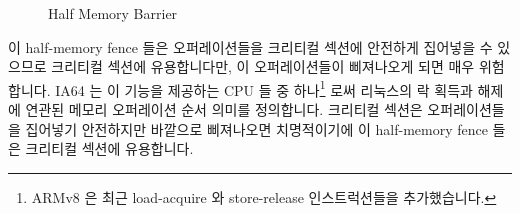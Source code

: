 \begin{figure}[tb]
\centering
{}
\caption{Half Memory Barrier}
\end{figure}

이 half-memory fence 들은 오퍼레이션들을 크리티컬 섹션에 안전하게 집어넣을 수
있으므로 크리티컬 섹션에 유용합니다만, 이 오퍼레이션들이 삐져나오게 되면 매우
위험합니다.
IA64 는 이 기능을 제공하는 CPU 들 중 하나\footnote{
	ARMv8 은 최근 load-acquire 와 store-release 인스트럭션들을
	추가했습니다.}
로써 리눅스의 락 획득과 해제에 연관된 메모리 오퍼레이션 순서 의미를 정의합니다.
크리티컬 섹션은 오퍼레이션들을 집어넣기 안전하지만 바깥으로 삐져나오면
치명적이기에 이 half-memory fence 들은 크리티컬 섹션에 유용합니다.

